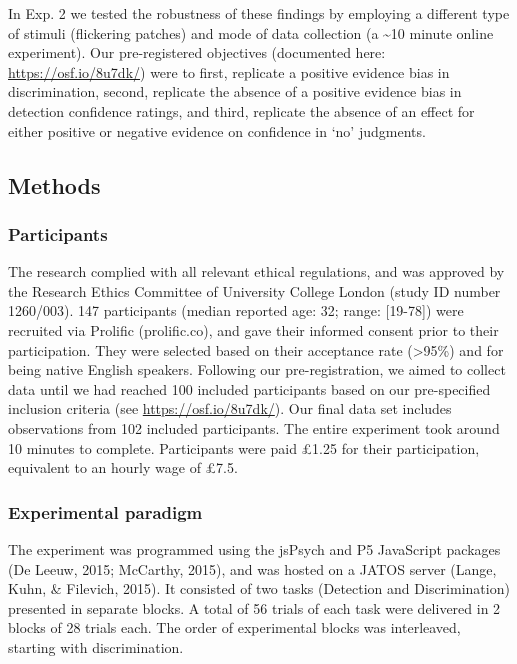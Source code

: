 \documentclass[12pt,twoside]{reedthesis}
\begin{document}
In Exp. 2 we tested the robustness of these findings by employing a different type of stimuli (flickering patches) and mode of data collection (a \textasciitilde10 minute online experiment). Our pre-registered objectives (documented here: \url{https://osf.io/8u7dk/}) were to first, replicate a positive evidence bias in discrimination, second, replicate the absence of a positive evidence bias in detection confidence ratings, and third, replicate the absence of an effect for either positive or negative evidence on confidence in `no' judgments.

\hypertarget{methods-1}{%
\subsection{Methods}\label{methods-1}}

\hypertarget{participants-5}{%
\subsubsection{Participants}\label{participants-5}}

The research complied with all relevant ethical regulations, and was approved by the Research Ethics Committee of University College London (study ID number 1260/003). 147 participants (median reported age: 32; range: {[}19-78{]}) were recruited via Prolific (prolific.co), and gave their informed consent prior to their participation. They were selected based on their acceptance rate (\textgreater95\%) and for being native English speakers. Following our pre-registration, we aimed to collect data until we had reached 100 included participants based on our pre-specified inclusion criteria (see \url{https://osf.io/8u7dk/}). Our final data set includes observations from 102 included participants. The entire experiment took around 10 minutes to complete. Participants were paid £1.25 for their participation, equivalent to an hourly wage of £7.5.

\hypertarget{experimental-paradigm}{%
\subsubsection{Experimental paradigm}\label{experimental-paradigm}}

The experiment was programmed using the jsPsych and P5 JavaScript packages (De Leeuw, 2015; McCarthy, 2015), and was hosted on a JATOS server (Lange, Kuhn, \& Filevich, 2015). It consisted of two tasks (Detection and Discrimination) presented in separate blocks. A total of 56 trials of each task were delivered in 2 blocks of 28 trials each. The order of experimental blocks was interleaved, starting with discrimination.
\end{document}
